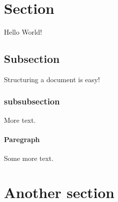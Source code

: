 \documentclass{article}
\begin{document}
	\section{Section}
	Hello World!
	\subsection{Subsection}
	Structuring a document is easy!
	\subsubsection{subsubsection}
	More text.
	\paragraph{Paregraph}
	Some more text.
	\section{Another section}
\end{document}
